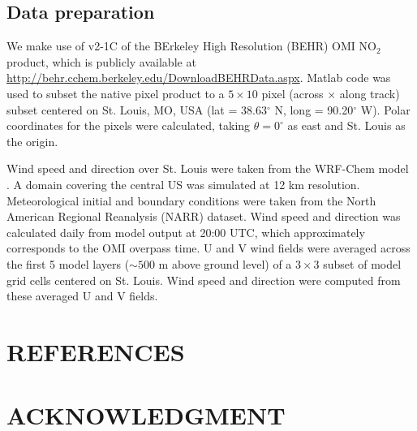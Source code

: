 \documentclass[a4paper,10pt,oneside]{article}
\newcommand{\ce}[1]{$\mathrm{#1}$}
\begin{document}
\begin{sloppy}
\subsection{Data preparation}
	We make use of v2-1C of the BErkeley High Resolution (BEHR) OMI \ce{NO_2} product, which is publicly available at \url{http://behr.cchem.berkeley.edu/DownloadBEHRData.aspx}. Matlab code was used to subset the native pixel product to a $5 \times 10$ pixel (across $\times$ along track) subset centered on St. Louis, MO, USA (lat = 38.63$^\circ$ N, long = 90.20$^\circ$ W). Polar coordinates for the pixels were calculated, taking $\theta = 0^\circ$ as east and St. Louis as the origin. 
	
	Wind speed and direction over St. Louis were taken from the WRF-Chem model \cite{grell05}. A domain covering the central US was simulated at 12 km resolution. Meteorological initial and boundary conditions were taken from the North American Regional Reanalysis (NARR) dataset. Wind speed and direction was calculated daily from model output at 20:00 UTC, which approximately corresponds to the OMI overpass time. U and V wind fields were averaged across the first 5 model layers ($\sim 500$ m above ground level) of a $3 \times 3$ subset of model grid cells centered on St. Louis.  Wind speed and direction were computed from these averaged U and V fields.


\section{REFERENCES}
\label{sec:ref}


\section{ACKNOWLEDGMENT}
\label{sec:ack}



\footnotesize{

}
%
% 
%
% 

\end{sloppy}
\end{document}
